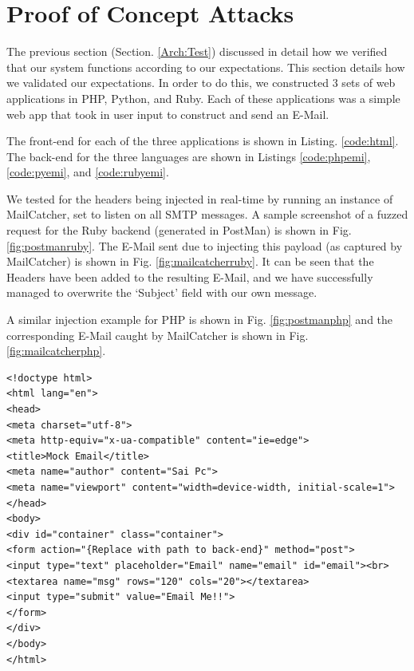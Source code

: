 \section{Proof of Concept Attacks}
The previous section (Section. \ref{Arch:Test}) discussed in detail how we verified that our system functions according to our expectations. This section details how we validated our expectations. In order to do this, we constructed 3 sets of web applications in PHP, Python, and Ruby. Each of these applications was a simple web app that took in user input to construct and send an E-Mail.

The front-end for each of the three applications is shown in Listing. \ref{code:html}. The back-end for the three languages are shown in Listings \ref{code:phpemi}, \ref{code:pyemi}, and \ref{code:rubyemi}.

We tested for the headers being injected in real-time by running an instance of MailCatcher, set to listen on all SMTP messages. A sample screenshot of a fuzzed request for the Ruby backend (generated in PostMan) is shown in Fig. \ref{fig:postmanruby}. The E-Mail sent due to injecting this payload (as captured by MailCatcher) is shown in Fig. \ref{fig:mailcatcherruby}. It can be seen that the Headers have been added to the resulting E-Mail, and we have successfully managed to overwrite the `Subject' field with our own message.

A similar injection example for PHP is shown in Fig. \ref{fig:postmanphp} and the corresponding E-Mail caught by MailCatcher is shown in Fig. \ref{fig:mailcatcherphp}.

\begin{lstlisting}
<!doctype html>
<html lang="en">
<head>
<meta charset="utf-8">
<meta http-equiv="x-ua-compatible" content="ie=edge">
<title>Mock Email</title>
<meta name="author" content="Sai Pc">
<meta name="viewport" content="width=device-width, initial-scale=1">
</head>
<body>
<div id="container" class="container">
<form action="{Replace with path to back-end}" method="post">
<input type="text" placeholder="Email" name="email" id="email"><br>
<textarea name="msg" rows="120" cols="20"></textarea>
<input type="submit" value="Email Me!!">
</form>
</div>
</body>
</html>

\end{lstlisting}

